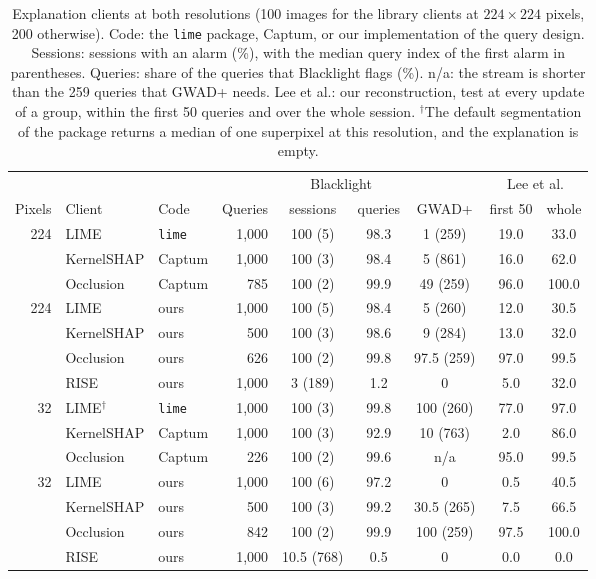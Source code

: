 \begin{table}[!tbp]
\centering\footnotesize\setlength{\tabcolsep}{4pt}
\caption{Explanation clients at both resolutions (100 images for the library clients at $224\times224$ pixels, 200 otherwise). Code: the \texttt{lime} package, Captum, or our implementation of the query design. Sessions: sessions with an alarm (\%), with the median query index of the first alarm in parentheses. Queries: share of the queries that Blacklight flags (\%). n/a: the stream is shorter than the 259 queries that GWAD+ needs. Lee et al.: our reconstruction, test at every update of a group, within the first 50 queries and over the whole session. $^{\dagger}$The default segmentation of the package returns a median of one superpixel at this resolution, and the explanation is empty.}
\label{tab:expl-all}
\vspace{3pt}
\begin{adjustbox}{max width=\textwidth}
\begin{tabular}{rllrccccc}
\toprule
& & & & \multicolumn{2}{c}{Blacklight} & & \multicolumn{2}{c}{Lee et al.} \\
\cmidrule(lr){5-6}\cmidrule(lr){8-9}
Pixels & Client & Code & Queries & sessions & queries & GWAD+ & first 50 & whole \\
\midrule
224 & LIME & \texttt{lime} & 1{,}000 & 100 (5) & 98.3 & 1 (259) & 19.0 & 33.0 \\
 & KernelSHAP & Captum & 1{,}000 & 100 (3) & 98.4 & 5 (861) & 16.0 & 62.0 \\
 & Occlusion & Captum & 785 & 100 (2) & 99.9 & 49 (259) & 96.0 & 100.0 \\[2pt]
224 & LIME & ours & 1{,}000 & 100 (5) & 98.4 & 5 (260) & 12.0 & 30.5 \\
 & KernelSHAP & ours & 500 & 100 (3) & 98.6 & 9 (284) & 13.0 & 32.0 \\
 & Occlusion & ours & 626 & 100 (2) & 99.8 & 97.5 (259) & 97.0 & 99.5 \\
 & RISE & ours & 1{,}000 & 3 (189) & 1.2 & 0 & 5.0 & 32.0 \\[2pt]
32 & LIME$^{\dagger}$ & \texttt{lime} & 1{,}000 & 100 (3) & 99.8 & 100 (260) & 77.0 & 97.0 \\
 & KernelSHAP & Captum & 1{,}000 & 100 (3) & 92.9 & 10 (763) & 2.0 & 86.0 \\
 & Occlusion & Captum & 226 & 100 (2) & 99.6 & n/a & 95.0 & 99.5 \\[2pt]
32 & LIME & ours & 1{,}000 & 100 (6) & 97.2 & 0 & 0.5 & 40.5 \\
 & KernelSHAP & ours & 500 & 100 (3) & 99.2 & 30.5 (265) & 7.5 & 66.5 \\
 & Occlusion & ours & 842 & 100 (2) & 99.9 & 100 (259) & 97.5 & 100.0 \\
 & RISE & ours & 1{,}000 & 10.5 (768) & 0.5 & 0 & 0.0 & 0.0 \\
\bottomrule
\end{tabular}
\end{adjustbox}
\end{table}
